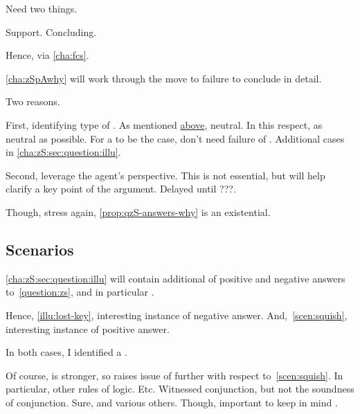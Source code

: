 \begin{note}
  Need two things.

  Support.
  Concluding.

  Hence, \support{} via \autoref{cha:fcs}.

  \autoref{cha:zSpAwhy} will work through the move to failure to conclude in detail.

  Two reasons.

  First, identifying type of \scen{}.
  As mentioned \hyperref[qzS:intro:qualification]{above}, neutral.
  In this respect, as neutral as possible.
  For a \scen{} to be the case, don't need failure of \issueConstraint{}.
  Additional cases in \autoref{cha:zS:sec:question:illu}.

  Second, leverage the agent's perspective.
  This is not essential, but will help clarify a key point of the argument.
  Delayed until {\color{blue} ???}.

  Though, stress again, \autoref{prop:qzS-answers-why} is an existential.
\end{note}

\subsection{Scenarios}
\label{cha:zS:sec:question:scenarios}

\begin{note}
  \autoref{cha:zS:sec:question:illu} will contain additional  of positive and negative answers to~\autoref{question:zs}, and in particular .
\end{note}

\begin{note}
  Hence, \autoref{illu:lost-key}, interesting instance of negative answer.
  And,~\autoref{scen:squish}, interesting instance of positive answer.

  In both cases, I identified a \requ{}.

  Of course, \qzS{} is stronger, so raises issue of further  with respect to~\autoref{scen:squish}.
  In particular, other rules of logic.
  Etc.
  Witnessed conjunction, but not the soundness of conjunction.
  Sure, and various others.
  Though, important to keep in mind \requ{}.
\end{note}

